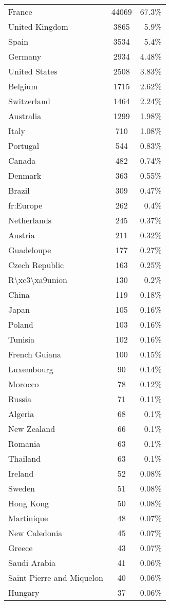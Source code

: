 \documentclass[11pt]{article}
\begin{document}
\begin{center}
\begin{longtable}{|l|c|r|}
France& 44069& 67.3\%\\
United Kingdom& 3865& 5.9\%\\
Spain& 3534& 5.4\%\\
Germany& 2934& 4.48\%\\
United States& 2508& 3.83\%\\
Belgium& 1715& 2.62\%\\
Switzerland& 1464& 2.24\%\\
Australia& 1299& 1.98\%\\
Italy& 710& 1.08\%\\
Portugal& 544& 0.83\%\\
Canada& 482& 0.74\%\\
Denmark& 363& 0.55\%\\
Brazil& 309& 0.47\%\\
fr:Europe& 262& 0.4\%\\
Netherlands& 245& 0.37\%\\
Austria& 211& 0.32\%\\
Guadeloupe& 177& 0.27\%\\
Czech Republic& 163& 0.25\%\\
R\textbackslash xc3\textbackslash xa9union& 130& 0.2\%\\
China& 119& 0.18\%\\
Japan& 105& 0.16\%\\
Poland& 103& 0.16\%\\
Tunisia& 102& 0.16\%\\
French Guiana& 100& 0.15\%\\
Luxembourg& 90& 0.14\%\\
Morocco& 78& 0.12\%\\
Russia& 71& 0.11\%\\
Algeria& 68& 0.1\%\\
New Zealand& 66& 0.1\%\\
Romania& 63& 0.1\%\\
Thailand& 63& 0.1\%\\
Ireland& 52& 0.08\%\\
Sweden& 51& 0.08\%\\
Hong Kong& 50& 0.08\%\\
Martinique& 48& 0.07\%\\
New Caledonia& 45& 0.07\%\\
Greece& 43& 0.07\%\\
Saudi Arabia& 41& 0.06\%\\
Saint Pierre and Miquelon& 40& 0.06\%\\
Hungary& 37& 0.06\%\\

\end{longtable}
\end{center}
\end{document}
